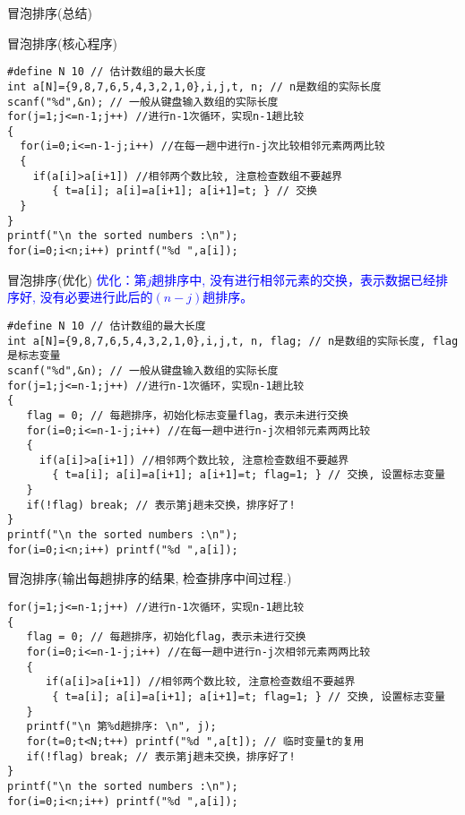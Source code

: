 \begin{frame}{冒泡排序(总结)}
\end{frame}

\begin{frame}{冒泡排序(核心程序)}
\begin{lstlisting}
#define N 10 // 估计数组的最大长度
int a[N]={9,8,7,6,5,4,3,2,1,0},i,j,t, n; // n是数组的实际长度
scanf("%d",&n); // 一般从键盘输入数组的实际长度
for(j=1;j<=n-1;j++) //进行n-1次循环，实现n-1趟比较
{
  for(i=0;i<=n-1-j;i++) //在每一趟中进行n-j次比较相邻元素两两比较
  {
    if(a[i]>a[i+1]) //相邻两个数比较, 注意检查数组不要越界 
       { t=a[i]; a[i]=a[i+1]; a[i+1]=t; } // 交换
  }
}
printf("\n the sorted numbers :\n");
for(i=0;i<n;i++) printf("%d ",a[i]);
\end{lstlisting}
\end{frame}

\begin{frame}{冒泡排序(优化)}
\textcolor{blue}{优化：第$j$趟排序中, 没有进行相邻元素的交换，表示数据已经排序好, 没有必要进行此后的$(n-j)$趟排序。}
\begin{lstlisting}
#define N 10 // 估计数组的最大长度
int a[N]={9,8,7,6,5,4,3,2,1,0},i,j,t, n, flag; // n是数组的实际长度, flag是标志变量
scanf("%d",&n); // 一般从键盘输入数组的实际长度
for(j=1;j<=n-1;j++) //进行n-1次循环，实现n-1趟比较
{
   flag = 0; // 每趟排序，初始化标志变量flag，表示未进行交换
   for(i=0;i<=n-1-j;i++) //在每一趟中进行n-j次相邻元素两两比较
   {
     if(a[i]>a[i+1]) //相邻两个数比较, 注意检查数组不要越界 
       { t=a[i]; a[i]=a[i+1]; a[i+1]=t; flag=1; } // 交换, 设置标志变量
   }
   if(!flag) break; // 表示第j趟未交换，排序好了!
}
printf("\n the sorted numbers :\n");
for(i=0;i<n;i++) printf("%d ",a[i]);
\end{lstlisting}
\end{frame}

\begin{frame}{冒泡排序(输出每趟排序的结果, 检查排序中间过程.)}
\begin{lstlisting}
for(j=1;j<=n-1;j++) //进行n-1次循环，实现n-1趟比较
{
   flag = 0; // 每趟排序，初始化flag，表示未进行交换
   for(i=0;i<=n-1-j;i++) //在每一趟中进行n-j次相邻元素两两比较
   {
      if(a[i]>a[i+1]) //相邻两个数比较, 注意检查数组不要越界 
       { t=a[i]; a[i]=a[i+1]; a[i+1]=t; flag=1; } // 交换, 设置标志变量
   }
   printf("\n 第%d趟排序: \n", j);
   for(t=0;t<N;t++) printf("%d ",a[t]); // 临时变量t的复用
   if(!flag) break; // 表示第j趟未交换，排序好了!
}
printf("\n the sorted numbers :\n");
for(i=0;i<n;i++) printf("%d ",a[i]);
\end{lstlisting}
\end{frame}